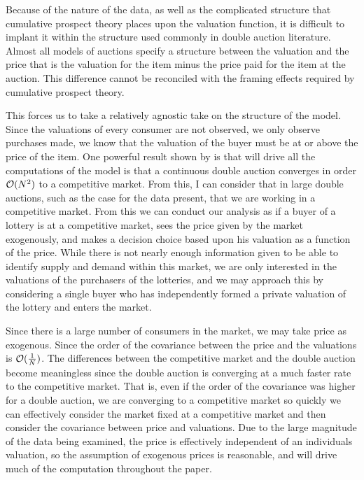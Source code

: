 \documentclass[12pt, letterpaper]{paper}
\def\BigO{{\cal O}}
\begin{document}
Because of the nature of the data, as well as the complicated
structure that cumulative prospect theory places upon the valuation
function, it is difficult to implant it within the structure used
commonly in double auction literature. Almost all models of auctions
specify a structure between the valuation and the price that is the
valuation for the item minus the price paid for the item at the
auction. This difference cannot be reconciled with the framing effects
required by cumulative prospect theory.

This forces us to take a relatively agnostic take on the structure of
the model. Since the valuations of every consumer are not observed, we
only observe purchases made, we know that the valuation of the buyer
must be at or above the price of the item. One powerful result shown
by \cite{Efficiency} is that will drive all the computations of the
model is that a continuous double auction converges in order $\BigO (
N^2 )$ to a competitive market. From this, I can consider that in large
double auctions, such as the case for the data present, that we are
working in a competitive market. From this we can conduct our analysis
as if a buyer of a lottery is at a competitive market, sees the price
given by the market exogenously, and makes a decision choice based
upon his valuation as a function of the price. While there is not
nearly enough information given to be able to identify supply and
demand within this market, we are only interested in the valuations of
the purchasers of the lotteries, and we may approach this by
considering a single buyer who has independently formed a private
valuation of the lottery and enters the market.

Since there is a  large number of consumers in the market, we may take
price as exogenous. Since the order of the covariance between the
price and the valuations is $\BigO ( \frac{1}{N} )$. The differences
between the competitive market and the double auction become
meaningless since the double auction is converging at a much faster
rate to the competitive market. That is, even if the order of the
covariance was higher for a double auction, we are converging to a
competitive market so quickly we can effectively consider the market
fixed at a competitive market and then consider the covariance between
price and valuations. Due to the large magnitude of the data being
examined, the price is effectively independent of an individuals
valuation, so the assumption of exogenous prices is reasonable, and
will drive much of the computation throughout the paper.
\end{document}
